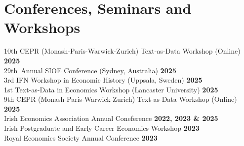 \documentclass{resume}
\begin{document}
\section{Conferences, Seminars and Workshops} 
\begin{content}
    {10th CEPR (Monash-Paris-Warwick-Zurich) Text-as-Data Workshop (Online)} \hfill {\bf 2025} \\
    {29th Annual SIOE Conference (Sydney, Australia)} \hfill {\bf 2025} \\
    {3rd IFN Workshop in Economic History (Uppsala, Sweden)} \hfill {\bf 2025} \\
    {1st Text-as-Data in Economics Workshop (Lancaster University)} \hfill {\bf 2025} \\
    {9th CEPR (Monash-Paris-Warwick-Zurich) Text-as-Data Workshop (Online)} \hfill {\bf 2025} \\
    {Irish Economics Association Annual Coneference} \hfill {\bf 2022, 2023 \& 2025} \\
    {Irish Postgraduate and Early Career Economics Workshop} \hfill {\bf 2023}\\
    {Royal Economics Society Annual Conference} \hfill {\bf 2023} \\
\sectionlineskip
\end{content}
\vspace{-3\medskipamount}

%
\end{document}
